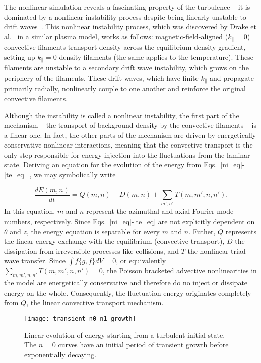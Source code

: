 \documentclass[letter,scriptaddress,twocolumn, prl,showkeys]{revtex4}
\def\beq{\begin{equation}}
\def\eeq{\end{equation}}
\def\para{\parallel}
\newcommand{\diff}[2]{\frac{d#1}{d#2}}
\begin{document}
The nonlinear simulation reveals a fascinating property of the turbulence -- it is dominated by a nonlinear instability process despite being linearly unstable to drift waves~\cite{friedman2012b,friedman2013}.
This nonlinear instability process, which was discovered by Drake et al.~\cite{drake1995} in a similar plasma model, works as follows: 
magnetic-field-aligned ($k_\para=0$) convective filaments transport density across the equilibrium density gradient, setting up $k_\para=0$ density filaments (the same applies to the temperature). 
These filaments are unstable to a secondary drift wave instability,
which grows on the periphery of the filaments. 
These drift waves, which have finite $k_\para$ and propagate primarily
radially, nonlinearly couple to one another and reinforce the original
convective filaments.

Although the instability is called a nonlinear instability, the first part of the mechanism -- the transport of background density by the convective filaments -- is a linear one.
In fact, the other parts of the mechanism are driven by energetically conservative nonlinear interactions, 
meaning that the convective transport is the only step responsible for energy injection into the fluctuations from the laminar state.
Deriving an equation for the evolution of the energy from Eqs.~\ref{ni_eq}-\ref{te_eq}~\cite{friedman2012b,friedman2013}, we may symbolically write

\beq
\label{dEdt_def}
\diff{E(m,n)}{t} = Q(m,n) + D(m,n) + \sum_{m',n'} T(m,m',n,n').
\eeq
In this equation, $m$ and $n$ represent the azimuthal and axial Fourier mode numbers, respectively. 
Since Eqs.~\ref{ni_eq}-\ref{te_eq} are not explicitly dependent on $\theta$ and $z$, the energy equation is separable for every $m$ and $n$. 
Futher, $Q$ represents the linear energy exchange with the equilibrium (convective transport), $D$ the dissipation from irreversible processes
like collisions, and $T$ the nonlinear triad wave transfer. Since $\int f \{g,f\} dV = 0$, or equivalently $\sum_{m,m',n,n'} T(m,m',n,n')=0$, 
the Poisson bracketed advective nonlinearities in the model are energetically conservative and therefore do no inject or dissipate energy on the whole.
Consequently, the fluctuation energy originates completely from $Q$, the linear convective transport mechanism.

\begin{figure}
\centerline{\texttt{[image: transient\_n0\_n1\_growth]}}
\caption{Linear evolution of energy starting from a turbulent initial state. The $n=0$ curves have an initial period of transient growth before exponentially decaying.}
\label{transient_n0_n1_growth}
\end{figure}
\end{document}
